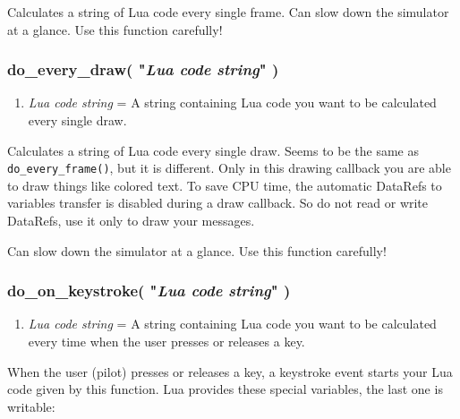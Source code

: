 \documentclass[11pt,parskip=half,a4paper]{scrartcl}
\begin{document}
Calculates a string of Lua code every single frame. Can slow down the simulator at a glance. Use this function carefully!

\subsubsection{do\_every\_draw( "\emph{Lua code string}" )}

\begin{enumerate}
	\item \emph{Lua code string} = A string containing Lua code you want to be calculated every single draw.
\end{enumerate}

Calculates a string of Lua code every single draw. Seems to be the same as \verb|do_every_frame()|, but it is different. Only in this drawing callback you are able to draw things like colored text. To save CPU time, the automatic DataRefs to variables transfer is disabled during a draw callback. So do not read or write DataRefs, use it only to draw your messages.

Can slow down the simulator at a glance. Use this function carefully!

\subsubsection{do\_on\_keystroke( "\emph{Lua code string}" )}

\begin{enumerate}
	\item \emph{Lua code string} = A string containing Lua code you want to be calculated every time when the user presses or releases a key.
\end{enumerate}

When the user (pilot) presses or releases a key, a keystroke event starts your Lua code given by this function. Lua provides these special variables, the last one is writable:
\end{document}
